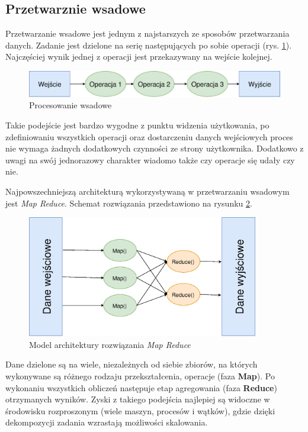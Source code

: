 \subsection{Przetwarznie wsadowe}
Przetwarzanie wsadowe jest jednym z najstarszych ze sposobów przetwarzania danych.
Zadanie jest dzielone na serię następujących po sobie operacji (rys. \ref{fig:BatchProcessing}).
Najczęściej wynik jednej z operacji jest przekazywany na wejście kolejnej.

\begin{figure}[htbp]
\centering
	\includegraphics[width=1\textwidth]{img/batch}
	\caption{Procesowanie wsadowe}
  \label{fig:BatchProcessing}
\end{figure}
Takie podejście jest bardzo wygodne z punktu widzenia użytkowania,
po zdefiniowaniu wszystkich operacji oraz dostarczeniu danych wejściowych
proces nie wymaga żadnych dodatkowych czynności ze strony użytkownika.
Dodatkowo z uwagi na swój jednorazowy charakter wiadomo także czy operacje się udały czy nie.

Najpowszechniejszą architekturą wykorzystywaną w przetwarzaniu wsadowym jest \textit{Map Reduce}.
Schemat rozwiązania przedstawiono na rysunku \ref{fig:MapReduce}.
\begin{figure}[htbp]
\centering
	\includegraphics[width=0.9\textwidth]{img/mr}
	\caption{Model architektury rozwiązania \textit{Map Reduce}}
  \label{fig:MapReduce}
\end{figure}
Dane dzielone są na wiele,
niezależnych od siebie zbiorów,
na których wykonywane są różnego rodzaju przekształcenia,
operacje (faza \textbf{Map}).
Po wykonaniu wszystkich obliczeń następuje etap agregowania (faza \textbf{Reduce}) otrzymanych wyników.
Zyski z takiego podejścia najlepiej są widoczne w środowisku rozproszonym (wiele maszyn, procesów i wątków),
gdzie dzięki dekompozycji zadania wzrastają możliwości skalowania.

